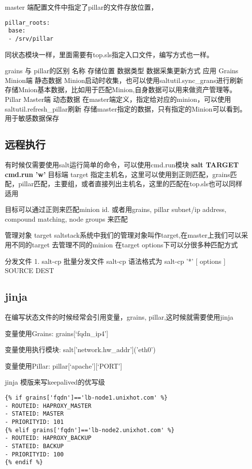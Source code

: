 master 端配置文件中指定了pillar的文件存放位置，
\begin{lstlisting}
pillar_roots:
 base:
 - /srv/pillar
\end{lstlisting}

同状态模块一样，里面需要有top.sls指定入口文件，编写方式也一样。



grains 与 pillar的区别
名称	存储位置	数据类型	数据采集更新方式	应用
Grains	Minion端	静态数据	Minion启动时收集，也可以使用saltutil.sync_grans进行刷新	存储Mnion基本数据，比如用于匹配Minion,自身数据可以用来做资产管理等。
Pillar	Master端	动态数据	在master端定义，指定给对应的minion，可以使用saltutil.refresh_pillar刷新	存储master指定的数据，只有指定的Minion可以看到。用于敏感数据保存

\subsection{远程执行}


有时候仅需要使用salt运行简单的命令，可以使用cmd.run模块  \textbf{salt TARGET cmd.run 'w'}
目标端 target 指定主机名，这里可以使用到正则匹配，grains匹配，pillar匹配，主要组，或者直接列出主机名，这里的匹配在top.sls也可以同样适用

目标可以通过正则来匹配minion id. 或者用grains, pillar subnet/ip address, compound matching, node groups 来匹配


管理对象 target
saltstack系统中我们的管理对象叫作target,在master上我们可以采用不同的target 去管理不同的minion
在target options下可以分很多种匹配方式

分发文件
1. salt-cp 批量分发文件 salt-cp 语法格式为
salt-cp '*' [ options ] SOURCE DEST


\subsection{jinja}


在编写状态文件的时候经常会引用变量，grains, pillar,这时候就需要使用jinja

变量使用Grains: {{ grains[‘fqdn_ip4’] }}

变量使用执行模块: {{ salt['network.hw_addr']('eth0') }}

变量使用Pillar: {{ pillar[‘apache'][‘PORT'] }}

jinja 模版来写keepalived的优写级

\begin{lstlisting}
{% if grains['fqdn']=='lb-node1.unixhot.com' %}
- ROUTEID: HAPROXY_MASTER
- STATEID: MASTER
- PRIORITYID: 101
{% elif grains['fqdn']=='lb-node2.unixhot.com' %}
- ROUTEID: HAPROXY_BACKUP
- STATEID: BACKUP
- PRIORITYID: 100
{% endif %}
\end{lstlisting}

